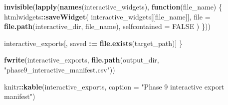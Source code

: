\documentclass[
]{article}
\newenvironment{Shaded}{\begin{snugshade}}{\end{snugshade}}
\newcommand{\AttributeTok}[1]{\textcolor[rgb]{0.13,0.29,0.53}{#1}}
\newcommand{\ConstantTok}[1]{\textcolor[rgb]{0.56,0.35,0.01}{#1}}
\newcommand{\ControlFlowTok}[1]{\textcolor[rgb]{0.13,0.29,0.53}{\textbf{#1}}}
\newcommand{\FunctionTok}[1]{\textcolor[rgb]{0.13,0.29,0.53}{\textbf{#1}}}
\newcommand{\NormalTok}[1]{#1}
\newcommand{\SpecialCharTok}[1]{\textcolor[rgb]{0.81,0.36,0.00}{\textbf{#1}}}
\newcommand{\StringTok}[1]{\textcolor[rgb]{0.31,0.60,0.02}{#1}}
\begin{document}
\begin{Shaded}
\begin{Highlighting}[]
  \FunctionTok{invisible}\NormalTok{(}\FunctionTok{lapply}\NormalTok{(}\FunctionTok{names}\NormalTok{(interactive\_widgets), }\ControlFlowTok{function}\NormalTok{(file\_name) \{}
\NormalTok{    htmlwidgets}\SpecialCharTok{::}\FunctionTok{saveWidget}\NormalTok{(}
\NormalTok{      interactive\_widgets[[file\_name]],}
      \AttributeTok{file =} \FunctionTok{file.path}\NormalTok{(interactive\_dir, file\_name),}
      \AttributeTok{selfcontained =} \ConstantTok{FALSE}
\NormalTok{    )}
\NormalTok{  \}))}

\NormalTok{  interactive\_exports[, saved }\SpecialCharTok{:=} \FunctionTok{file.exists}\NormalTok{(target\_path)]}
\NormalTok{\}}

\FunctionTok{fwrite}\NormalTok{(interactive\_exports, }\FunctionTok{file.path}\NormalTok{(output\_dir, }\StringTok{"phase9\_interactive\_manifest.csv"}\NormalTok{))}

\NormalTok{knitr}\SpecialCharTok{::}\FunctionTok{kable}\NormalTok{(interactive\_exports, }\AttributeTok{caption =} \StringTok{"Phase 9 interactive export manifest"}\NormalTok{)}
\end{Highlighting}
\end{Shaded}
\end{document}
